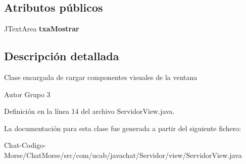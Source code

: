 \subsection*{Atributos públicos}
\begin{DoxyCompactItemize}
\item 
\hypertarget{classcom_1_1ucab_1_1javachat_1_1_servidor_1_1view_1_1_servidor_view_af10318edbbf3ea754e088eeea63626c0}{J\-Text\-Area {\bfseries txa\-Mostrar}}\label{classcom_1_1ucab_1_1javachat_1_1_servidor_1_1view_1_1_servidor_view_af10318edbbf3ea754e088eeea63626c0}

\end{DoxyCompactItemize}


\subsection{Descripción detallada}
Clase encargada de cargar componentes visuales de la ventana \begin{DoxyAuthor}{Autor}
Grupo 3 
\end{DoxyAuthor}


Definición en la línea 14 del archivo Servidor\-View.\-java.



La documentación para esta clase fue generada a partir del siguiente fichero\-:\begin{DoxyCompactItemize}
\item 
Chat-\/\-Codigo-\/\-Morse/\-Chat\-Morse/src/com/ucab/javachat/\-Servidor/view/Servidor\-View.\-java\end{DoxyCompactItemize}
